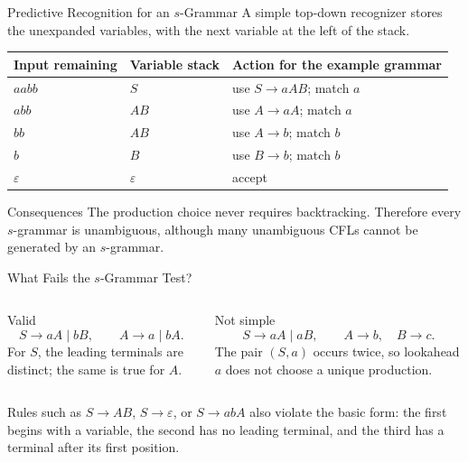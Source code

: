 \documentclass[10pt]{beamer}
\begin{document}
\begin{frame}{Predictive Recognition for an $s$-Grammar}
  \small
  A simple top-down recognizer stores the unexpanded variables, with the next
  variable at the left of the stack.
  \begin{center}
  \begin{tabular}{L{2.2cm}L{2.7cm}L{5.4cm}}
    \toprule
    Input remaining & Variable stack & Action for the example grammar \\
    \midrule
    $aabb$ & $S$ & use $S\to aAB$; match $a$ \\
    $abb$ & $AB$ & use $A\to aA$; match $a$ \\
    $bb$ & $AB$ & use $A\to b$; match $b$ \\
    $b$ & $B$ & use $B\to b$; match $b$ \\
    $\varepsilon$ & $\varepsilon$ & accept \\
    \bottomrule
  \end{tabular}
  \end{center}
  \begin{block}{Consequences}
    The production choice never requires backtracking. Therefore every
    $s$-grammar is unambiguous, although many unambiguous CFLs cannot be
    generated by an $s$-grammar.
  \end{block}
\end{frame}

\begin{frame}{What Fails the $s$-Grammar Test?}
  \small
  \begin{columns}[T]
    \begin{exampleblock}{Valid}
      \[
        S\to aA\mid bB,\qquad
        A\to a\mid bA.
      \]
      For $S$, the leading terminals are distinct; the same is true for $A$.
    \end{exampleblock}
    \begin{alertblock}{Not simple}
      \[
        S\to aA\mid aB,\qquad
        A\to b,\quad B\to c.
      \]
      The pair $(S,a)$ occurs twice, so lookahead $a$ does not choose a unique
      production.
    \end{alertblock}
  \end{columns}
  \vspace{0.2cm}
  Rules such as $S\to AB$, $S\to\varepsilon$, or $S\to abA$ also violate the
  basic form: the first begins with a variable, the second has no leading
  terminal, and the third has a terminal after its first position.
\end{frame}
\end{document}
